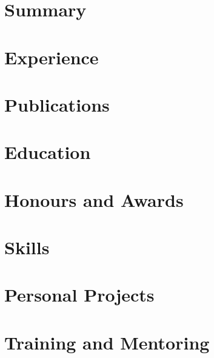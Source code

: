 \documentclass[english,a4paper,10pt]{extarticle}
\begin{document}
\pagestyle{normal_page}
\thispagestyle{first_page}

\section{Summary}


\section{Experience}


\section{Publications}


\section{Education}


\section{Honours and Awards}


\section{Skills}


\section{Personal Projects}



\section{Training and Mentoring}


\thispagestyle{last_page}

\end{document}
